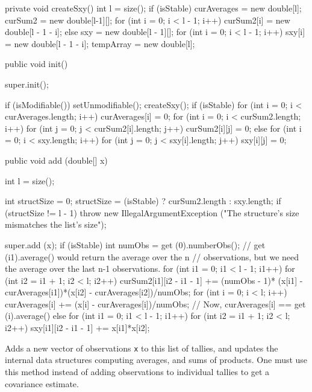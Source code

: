 \begin{code}\begin{hide}

   private void createSxy() {
      int l = size();
      if (isStable) {
         curAverages = new double[l];
         curSum2 = new double[l-1][];
         for (int i = 0; i < l - 1; i++)
            curSum2[i] = new double[l - 1 - i];
      }
      else {
         sxy = new double[l - 1][];
         for (int i = 0; i < l - 1; i++)
            sxy[i] = new double[l - 1 - i];
      }
      tempArray = new double[l];
   }

   public void init() {
      super.init();

      if (isModifiable()) {
         setUnmodifiable();
         createSxy();
      }
      if (isStable) {
         for (int i = 0; i < curAverages.length; i++)
            curAverages[i] = 0;
         for (int i = 0; i < curSum2.length; i++)
            for (int j = 0; j < curSum2[i].length; j++)
               curSum2[i][j] = 0;
      }
      else
         for (int i = 0; i < sxy.length; i++)
            for (int j = 0; j < sxy[i].length; j++)
               sxy[i][j] = 0;
   }\end{hide}

   public void add (double[] x)\begin{hide} {
      int l = size();

      int structSize = 0;
      structSize = (isStable) ? curSum2.length : sxy.length;
      if (structSize != l - 1)
            throw new IllegalArgumentException ("The structure's size mismatches the list's size");

      super.add (x);
      if (isStable) {
         int numObs = get (0).numberObs();
         // get (i1).average() would return the average over the n
         // observations, but we need the average over the last n-1 observations.
         for (int i1 = 0; i1 < l - 1; i1++)
            for (int i2 = i1 + 1; i2 < l; i2++)
               curSum2[i1][i2 - i1 - 1] += (numObs - 1)*
                  (x[i1] - curAverages[i1])*(x[i2] - curAverages[i2])/numObs;
         for (int i = 0; i < l; i++)
            curAverages[i] += (x[i] - curAverages[i])/numObs;
         // Now, curAverages[i] == get (i).average()
      }
      else
         for (int i1 = 0; i1 < l - 1; i1++)
            for (int i2 = i1 + 1; i2 < l; i2++)
               sxy[i1][i2 - i1 - 1] += x[i1]*x[i2];
   }\end{hide}
\end{code}
\begin{tabb}   Adds a new vector of observations \texttt{x} to this
  list of tallies, and updates the internal data structures computing
  averages, and sums of products.
  One must use this method instead of adding observations to
  individual tallies to get a covariance estimate.
\end{tabb}
